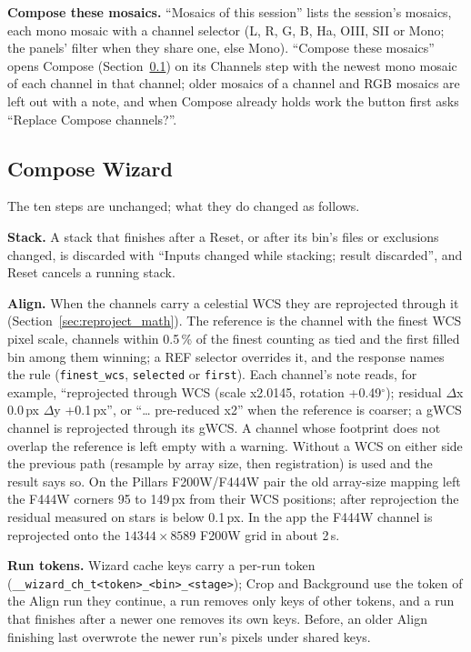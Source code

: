 \documentclass[11pt,a4paper]{article}
\newcommand{\code}[1]{\texttt{\small #1}}
\begin{document}
    \textbf{Compose these mosaics.} ``Mosaics of this session'' lists the session's mosaics, each mono mosaic with a channel selector (L, R, G, B, Ha, OIII, SII or Mono; the panels' filter when they share one, else Mono). ``Compose these mosaics'' opens Compose (Section~\ref{sec:compose}) on its Channels step with the newest mono mosaic of each channel in that channel; older mosaics of a channel and RGB mosaics are left out with a note, and when Compose already holds work the button first asks ``Replace Compose channels?''.

    \subsection{Compose Wizard}
    \label{sec:compose}

    The ten steps are unchanged; what they do changed as follows.

    \textbf{Stack.} A stack that finishes after a Reset, or after its bin's files or exclusions changed, is discarded with ``Inputs changed while stacking; result discarded'', and Reset cancels a running stack.

    \textbf{Align.} When the channels carry a celestial WCS they are reprojected through it (Section~\ref{sec:reproject_math}). The reference is the channel with the finest WCS pixel scale, channels within 0.5\,\% of the finest counting as tied and the first filled bin among them winning; a REF selector overrides it, and the response names the rule (\code{finest\_wcs}, \code{selected} or \code{first}). Each channel's note reads, for example, ``reprojected through WCS (scale x2.0145, rotation +0.49$^{\circ}$); residual $\Delta$x 0.0\,px $\Delta$y +0.1\,px'', or ``\ldots{} pre-reduced x2'' when the reference is coarser; a gWCS channel is reprojected through its gWCS. A channel whose footprint does not overlap the reference is left empty with a warning. Without a WCS on either side the previous path (resample by array size, then registration) is used and the result says so. On the Pillars F200W/F444W pair the old array-size mapping left the F444W corners 95 to 149\,px from their WCS positions; after reprojection the residual measured on stars is below 0.1\,px. In the app the F444W channel is reprojected onto the $14344 \times 8589$ F200W grid in about 2\,s.

    \textbf{Run tokens.} Wizard cache keys carry a per-run token (\code{\_\_wizard\_ch\_t<token>\_<bin>\_<stage>}); Crop and Background use the token of the Align run they continue, a run removes only keys of other tokens, and a run that finishes after a newer one removes its own keys. Before, an older Align finishing last overwrote the newer run's pixels under shared keys.
\end{document}

